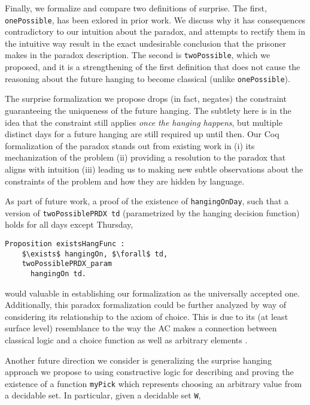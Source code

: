 \documentclass[journal]{journal}
\begin{document}
Finally, we formalize and compare two definitions of surprise. The first,
{\tt onePossible}, has been exlored in prior work. We discuss why it has
consequences contradictory to our intuition about the paradox, and attempts to
rectify them in the intuitive way result in the
exact undesirable conclusion that the prisoner makes in the paradox description.
The second is {\tt twoPossible}, which we proposed, and it is a strengthening of
the first definition that does not cause the reasoning about the future hanging to
become classical (unlike {\tt onePossible}).

The surprise formalization we propose drops (in fact, negates) the constraint
guaranteeing the uniqueness of the future hanging. The subtlety here is in the idea that the
constraint still applies \emph{once the hanging happens}, but multiple
distinct days for a future hanging are still required up until then.
Our Coq formalization of the paradox stands out from existing work in (i)
its mechanization of the problem (ii) providing a resolution to the paradox that aligns with
intuition (iii) leading us to making new subtle observations about the
constraints of the problem and how they are hidden by language.

As part of future work, a proof of the existence of {\tt hangingOnDay}, such that
a version of {\tt twoPossiblePRDX td} (parametrized by the hanging decision
function) holds for all days except Thursday,

\begin{lstlisting}[mathescape=true]
  Proposition existsHangFunc :
    $\exists$ hangingOn, $\forall$ td,
    twoPossiblePRDX_param
      hangingOn td.
\end{lstlisting}

would valuable in
establishing our formalization as the universally accepted one. Additionally,
this paradox formalization could be further analyzed by way of considering its
relationship to the axiom of choice. This is due to its (at least surface level)
resemblance to the way the AC makes a connection between classical logic
and a choice function \cite{} as well as arbitrary elements \cite{}.

Another future direction we consider is generalizing the surprise hanging
approach we propose to using constructive logic for describing and proving
the existence of a function {\tt myPick}
which represents choosing an arbitrary value from a decidable set. In particular,
given a decidable set {\tt W}, \newline
\end{document}
